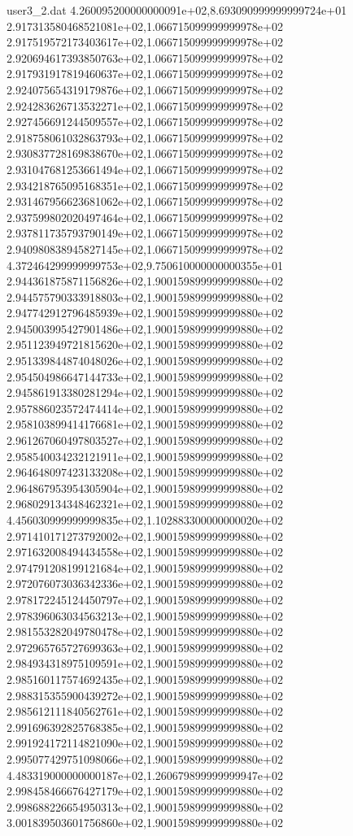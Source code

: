 \begin{filecontents}{user3_2.dat}
4.260095200000000091e+02,8.693090999999999724e+01
2.917313580468521081e+02,1.066715099999999978e+02
2.917519572173403617e+02,1.066715099999999978e+02
2.920694617393850763e+02,1.066715099999999978e+02
2.917931917819460637e+02,1.066715099999999978e+02
2.924075654319179876e+02,1.066715099999999978e+02
2.924283626713532271e+02,1.066715099999999978e+02
2.927456691244509557e+02,1.066715099999999978e+02
2.918758061032863793e+02,1.066715099999999978e+02
2.930837728169838670e+02,1.066715099999999978e+02
2.931047681253661494e+02,1.066715099999999978e+02
2.934218765095168351e+02,1.066715099999999978e+02
2.931467956623681062e+02,1.066715099999999978e+02
2.937599802020497464e+02,1.066715099999999978e+02
2.937811735793790149e+02,1.066715099999999978e+02
2.940980838945827145e+02,1.066715099999999978e+02
4.372464299999999753e+02,9.750610000000000355e+01
2.944361875871156826e+02,1.900159899999999880e+02
2.944575790333918803e+02,1.900159899999999880e+02
2.947742912796485939e+02,1.900159899999999880e+02
2.945003995427901486e+02,1.900159899999999880e+02
2.951123949721815620e+02,1.900159899999999880e+02
2.951339844874048026e+02,1.900159899999999880e+02
2.954504986647144733e+02,1.900159899999999880e+02
2.945861913380281294e+02,1.900159899999999880e+02
2.957886023572474414e+02,1.900159899999999880e+02
2.958103899414176681e+02,1.900159899999999880e+02
2.961267060497803527e+02,1.900159899999999880e+02
2.958540034232121911e+02,1.900159899999999880e+02
2.964648097423133208e+02,1.900159899999999880e+02
2.964867953954305904e+02,1.900159899999999880e+02
2.968029134348462321e+02,1.900159899999999880e+02
4.456030999999999835e+02,1.102883300000000020e+02
2.971410171273792002e+02,1.900159899999999880e+02
2.971632008494434558e+02,1.900159899999999880e+02
2.974791208199121684e+02,1.900159899999999880e+02
2.972076073036342336e+02,1.900159899999999880e+02
2.978172245124450797e+02,1.900159899999999880e+02
2.978396063034563213e+02,1.900159899999999880e+02
2.981553282049780478e+02,1.900159899999999880e+02
2.972965765727699363e+02,1.900159899999999880e+02
2.984934318975109591e+02,1.900159899999999880e+02
2.985160117574692435e+02,1.900159899999999880e+02
2.988315355900439272e+02,1.900159899999999880e+02
2.985612111840562761e+02,1.900159899999999880e+02
2.991696392825768385e+02,1.900159899999999880e+02
2.991924172114821090e+02,1.900159899999999880e+02
2.995077429751098066e+02,1.900159899999999880e+02
4.483319000000000187e+02,1.260679899999999947e+02
2.998458466676427179e+02,1.900159899999999880e+02
2.998688226654950313e+02,1.900159899999999880e+02
3.001839503601756860e+02,1.900159899999999880e+02

\end{filecontents}
